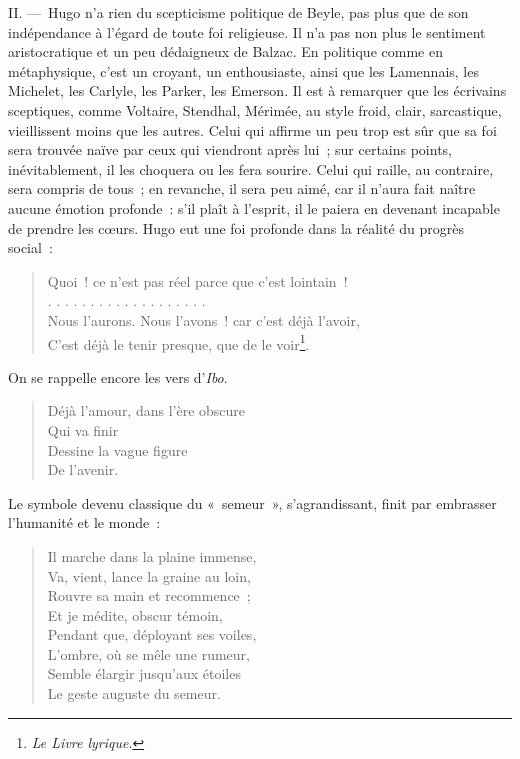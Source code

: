 \documentclass[french,twoside]{book} %
\begin{document}
\noindent II. — Hugo n’a rien du scepticisme politique de Beyle, pas plus que de son indépendance à l’égard de toute foi religieuse. Il n’a pas non plus le sentiment aristocratique et un peu dédaigneux de Balzac. En politique comme en métaphysique, c’est un croyant, un enthousiaste, ainsi que les Lamennais, les Michelet, les Carlyle, les Parker, les Emerson. Il est à remarquer que les écrivains sceptiques, comme Voltaire, Stendhal, Mérimée, au style froid, clair, sarcastique, vieillissent moins que les autres. Celui qui affirme un peu trop est sûr que sa foi sera trouvée naïve par ceux qui viendront après lui ; sur certains points, inévitablement, il les choquera ou les fera sourire. Celui qui raille, au contraire, sera compris de tous ; en revanche, il sera peu aimé, car il n’aura fait naître aucune émotion profonde : s’il plaît à l’esprit, il le paiera en devenant incapable de prendre les cœurs. Hugo eut une foi profonde dans la réalité du progrès social :\par


\begin{verse}
Quoi ! ce n’est pas réel parce que c’est lointain !\\
. . . . . . . . . . . . . . . . . . .\\
Nous l’aurons. Nous l’avons ! car c’est déjà l’avoir,\\
C’est déjà le tenir presque, que de le voir\footnote{\emph{Le Livre lyrique}.}.\\
\end{verse}

\noindent On se rappelle encore les vers d’\emph{Ibo}.\par


\begin{verse}
Déjà l’amour, dans l’ère obscure\\
Qui va finir\\
Dessine la vague figure\\
De l’avenir.\\
\end{verse}

\noindent Le symbole devenu classique du « semeur », s’agrandissant, finit par embrasser l’humanité et le monde :\par


\begin{verse}
Il marche dans la plaine immense,\\
Va, vient, lance la graine au loin,\\
Rouvre sa main et recommence ;\\
Et je médite, obscur témoin,\\
Pendant que, déployant ses voiles,\\
L’ombre, où se mêle une rumeur,\\
Semble élargir jusqu’aux étoiles\\
Le geste auguste du semeur.\\
\end{verse}
\end{document}
